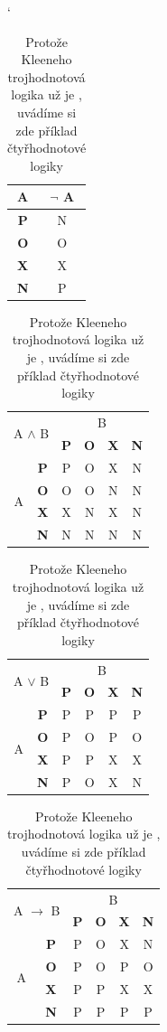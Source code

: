 \documentclass[a4paper,11pt]{article}
\begin{document}
\begin{table}[h]
\catcode` 

\begin{center}
\begin{tabular}{|c|c|}
\hline
A & $\neg$ A \\ \hline
\textbf{P} & N \\ \hline
\textbf{O} & O \\ \hline
\textbf{X} & X \\ \hline
\textbf{N} & P \\\hline
\end{tabular}
\begin{tabular}{|c|c|c|c|c|c|}
 \hline
 \multicolumn{2}{|c|}{\multirow{2}{*}{A $\wedge$ B}} & \multicolumn{4}{|c|}{B} \\ \cline{3-6}
 \multicolumn{2}{|c|}{} & \textbf{P} & \textbf{O} & \textbf{X} & \textbf{N} \\ \hline
 \multirow{4}{*}{A} & \textbf{P} & P & O & X & N \\ \cline{2-6}
 & \textbf{O} & O & O & N & N \\ \cline{2-6}
 & \textbf{X} & X & N & X & N \\ \cline{2-6}
 & \textbf{N} & N & N & N & N \\ \hline 
\end{tabular}
\begin{tabular}{|c|c|c|c|c|c|}
 \hline
 \multicolumn{2}{|c|}{\multirow{2}{*}{A $\vee$ B}} & \multicolumn{4}{|c|}{B} \\ \cline{3-6}
 \multicolumn{2}{|c|}{} & \textbf{P} & \textbf{O} & \textbf{X} & \textbf{N} \\ \hline
 \multirow{4}{*}{A} & \textbf{P} & P & P & P & P \\ \cline{2-6}
 & \textbf{O} & P & O & P & O \\ \cline{2-6}
 & \textbf{X} & P & P & X & X \\ \cline{2-6}
 & \textbf{N} & P & O & X & N \\ \hline 
\end{tabular}
\begin{tabular}{|c|c|c|c|c|c|}
 \hline
 \multicolumn{2}{|c|}{\multirow{2}{*}{A $\to$ B}} & \multicolumn{4}{|c|}{B} \\ \cline{3-6}
 \multicolumn{2}{|c|}{} & \textbf{P} & \textbf{O} & \textbf{X} & \textbf{N} \\ \hline
 \multirow{4}{*}{A} & \textbf{P} & P & O & X & N \\ \cline{2-6}
 & \textbf{O} & P & O & P & O \\ \cline{2-6}
 & \textbf{X} & P & P & X & X \\ \cline{2-6}
 & \textbf{N} & P & P & P & P \\ \hline 
\end{tabular}
\end{center}
\caption{Protože Kleeneho trojhodnotová logika už je , uvádíme si zde příklad čtyřhodnotové logiky}
\label{tab-logika}
\end{table}
\newpage
\end{document}
